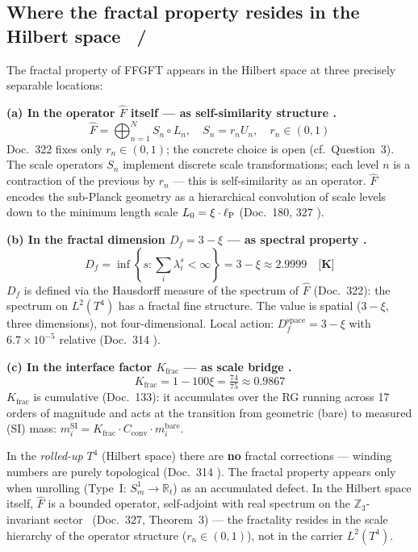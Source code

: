\subsection{Where the fractal property resides in the Hilbert space \K\ / \B}
\label{sec:fractal-hilbert}

The fractal property of FFGFT appears in the Hilbert space at
three precisely separable locations:

\textbf{(a) In the operator $\hat{F}$ itself — as self-similarity structure \B.}
\begin{equation}
  \hat{F} = \bigoplus_{n=1}^{N} S_n\circ L_n,\quad
  S_n = r_n U_n,\quad r_n \in (0,1)
\end{equation}
Doc.~322 fixes only $r_n \in (0,1)$; the concrete choice is open (cf.\ Question~3).
The scale operators $S_n$ implement discrete scale transformations;
each level $n$ is a contraction of the previous by $r_n$ —
this is self-similarity as an operator.
$\hat{F}$ encodes the sub-Planck geometry as a hierarchical
convolution of scale levels down to the minimum length scale
$L_0 = \xi\cdot\ell_{\mathrm{P}}$ (Doc.~180, 327 \K).

\textbf{(b) In the fractal dimension $D_f = 3-\xi$ — as spectral property \K.}
\begin{equation}
  D_f = \inf\!\left\{s:\sum_i\lambda_i^s<\infty\right\}
  = 3-\xi \approx 2.9999
  \quad\textbf{[K]}
\end{equation}
$D_f$ is defined via the Hausdorff measure of the spectrum of
$\hat{F}$ (Doc.~322): the spectrum on $L^2(T^4)$ has a fractal
fine structure. The value is spatial ($3-\xi$, three dimensions),
not four-dimensional.
Local action: $D_f^\text{space} = 3-\xi$ with $6.7\times10^{-5}$
relative (Doc.~314 \K).

\textbf{(c) In the interface factor $K_\text{frac}$ — as scale bridge \K.}
\begin{equation}
  K_\text{frac} = 1-100\xi = \tfrac{74}{75} \approx 0.9867
\end{equation}
$K_\text{frac}$ is cumulative (Doc.~133): it accumulates over the
RG running across 17 orders of magnitude and acts at the transition
from geometric (bare) to measured (SI) mass:
$m_i^\text{SI} = K_\text{frac}\cdot C_\text{conv}\cdot m_i^\text{bare}$.

\begin{tcolorbox}[ffgftbox,title={Decisive separation \K}]
  In the \emph{rolled-up} $T^4$ (Hilbert space) there are
  \textbf{no} fractal corrections —
  winding numbers are purely topological (Doc.~314 \K).
  The fractal property appears only when unrolling
  (Type~I: $S^1_m\to\mathbb{R}_t$) as an accumulated defect.
  In the Hilbert space itself, $\hat{F}$ is a bounded operator,
  self-adjoint with real spectrum on the $\mathbb{Z}_3$-invariant
  sector \B\ (Doc.~327, Theorem~3) —
  the fractality resides in the scale hierarchy of the operator
  structure ($r_n \in (0,1)$), not in the carrier $L^2(T^4)$.
\end{tcolorbox}

